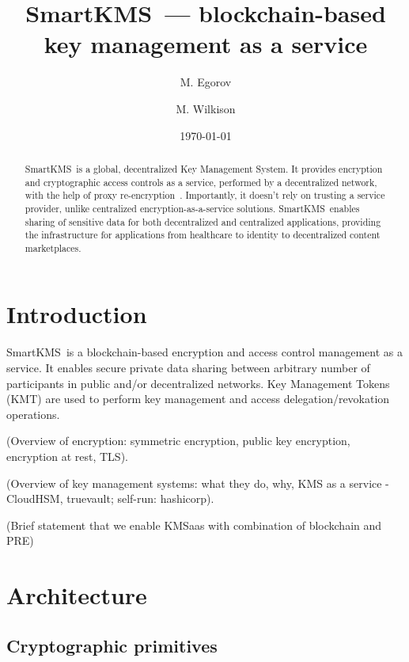 \documentclass[notitlepage,longbibliography]{revtex4-1}
\newcommand{\kms}{SmartKMS}
\begin{document}
\title{\kms~--- blockchain-based key management as a service}

\author{M. Egorov}
\author{M. Wilkison}


\begin{abstract}
    \kms~is a global, decentralized Key Management System.
    It provides encryption and cryptographic access controls as a service, performed by a decentralized network,
    with the help of proxy re-encryption~\cite{wiki:pre}.
    Importantly, it doesn't rely on trusting a service provider, unlike centralized encryption-as-a-service solutions.
    \kms~enables sharing of sensitive data for both decentralized and centralized applications,
    providing the infrastructure for applications from healthcare to identity to decentralized content marketplaces.
\end{abstract}

\date{\today}
\maketitle

\section{Introduction}

\kms~is a blockchain-based encryption and access control management as a service.
It enables secure private data sharing between arbitrary number of participants in public and/or decentralized networks.
Key Management Tokens (KMT) are used to perform key management and access delegation/revokation operations.

(Overview of encryption: symmetric encryption, public key encryption, encryption at rest, TLS).

(Overview of key management systems: what they do, why, KMS as a service - CloudHSM, truevault; self-run: hashicorp).

(Brief statement that we enable KMSaas with combination of blockchain and PRE)

\section{Architecture}

\subsection{Cryptographic primitives}
\end{document}

